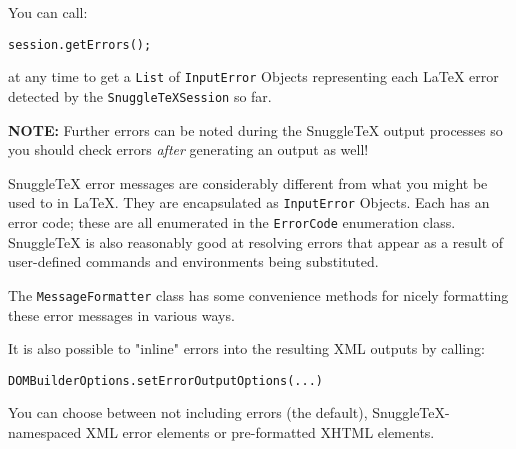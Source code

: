 You can call:
\begin{verbatim}session.getErrors();\end{verbatim}
at any time to get a \verb|List| of \verb|InputError| Objects representing each
LaTeX error detected by the \verb|SnuggleTeXSession| so far.

\textbf{NOTE:} Further errors can be noted during the SnuggleTeX output processes
so you should check errors \emph{after} generating an output as well!

SnuggleTeX error messages are considerably different from what you might be used to in
LaTeX. They are encapsulated as \verb|InputError| Objects. Each has an error
code; these are all enumerated in the \verb|ErrorCode| enumeration class.
SnuggleTeX is also reasonably good at resolving errors that appear as a result
of user-defined commands and environments being substituted.

The \verb|MessageFormatter| class has some convenience methods for nicely formatting
these error messages in various ways.

It is also possible to "inline" errors into the resulting XML outputs by
calling:
\begin{verbatim}DOMBuilderOptions.setErrorOutputOptions(...)\end{verbatim}
You can choose between not including errors (the default),
SnuggleTeX-namespaced XML error elements or pre-formatted XHTML elements.
